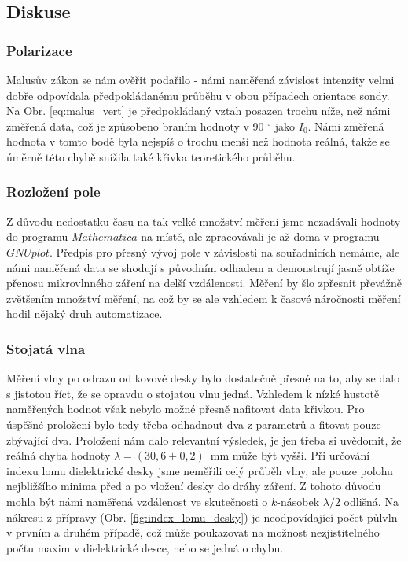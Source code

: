 \documentclass[english]{article}
\begin{document}
	\subsection{Diskuse}
			\subsubsection{Polarizace}
					Malusův zákon se nám ověřit podařilo - námi naměřená závislost intenzity velmi dobře odpovídala předpokládanému průběhu v obou případech orientace sondy. Na Obr. \ref{eq:malus_vert} je předpokládaný vztah posazen trochu níže, než námi změřená data, což je způsobeno braním hodnoty v 90 $^\circ$ jako $I_0$. Námi změřená hodnota v tomto bodě byla nejspíš o trochu menší než hodnota reálná, takže se úměrně této chybě snížila také křivka teoretického průběhu. 
			\subsubsection{Rozložení pole}
					Z důvodu nedostatku času na tak velké množství měření jsme nezadávali hodnoty do programu $Mathematica$ na místě, ale zpracovávali je až doma v programu $GNUplot$. Předpis pro přesný vývoj pole v závislosti na souřadnicích nemáme, ale námi naměřená data se shodují s původním odhadem a demonstrují jasně obtíže přenosu mikrovlnného záření na delší vzdálenosti. Měření by šlo zpřesnit převážně zvětšením množství měření, na což by se ale vzhledem k časové náročnosti měření hodil nějaký druh automatizace.
			\subsubsection{Stojatá vlna}
					Měření vlny po odrazu od kovové desky bylo dostatečně přesné na to, aby se dalo s jistotou říct, že se opravdu o stojatou vlnu jedná. Vzhledem k nízké hustotě naměřených hodnot však nebylo možné přesně nafitovat data křivkou. Pro úspěšné proložení bylo tedy třeba odhadnout dva z parametrů a fitovat pouze zbývající dva. Proložení nám dalo relevantní výsledek, je jen třeba si uvědomit, že reálná chyba hodnoty $\lambda=(30,6\pm0,2)$~mm může být vyšší. Při určování indexu lomu dielektrické desky jsme neměřili celý průběh vlny, ale pouze polohu nejbližšího minima před a po vložení desky do dráhy záření. Z tohoto důvodu mohla být námi naměřená vzdálenost ve skutečnosti o $k$-násobek $\lambda/2$ odlišná. Na nákresu z přípravy (Obr. \ref{fig:index_lomu_desky}) je neodpovídající počet půlvln v prvním a druhém případě, což může poukazovat na možnost nezjistitelného počtu maxim v dielektrické desce, nebo se jedná o chybu.
\end{document}
